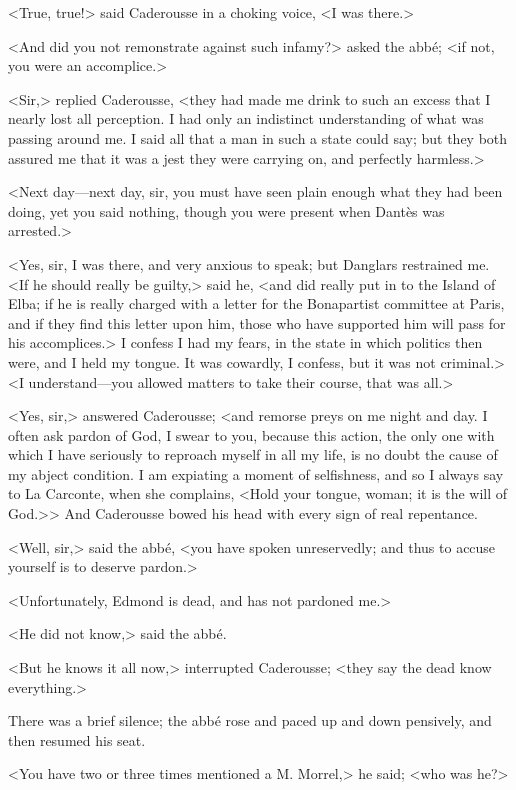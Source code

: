  <True, true!> said Caderousse in a choking voice, <I was there.> 

 <And did you not remonstrate against such infamy?> asked the abbé; <if not, you were an accomplice.> 

 <Sir,> replied Caderousse, <they had made me drink to such an excess that I nearly lost all perception. I had only an indistinct understanding of what was passing around me. I said all that a man in such a state could say; but they both assured me that it was a jest they were carrying on, and perfectly harmless.> 

 <Next day—next day, sir, you must have seen plain enough what they had been doing, yet you said nothing, though you were present when Dantès was arrested.> 

 <Yes, sir, I was there, and very anxious to speak; but Danglars restrained me. <If he should really be guilty,> said he, <and did really put in to the Island of Elba; if he is really charged with a letter for the Bonapartist committee at Paris, and if they find this letter upon him, those who have supported him will pass for his accomplices.> I confess I had my fears, in the state in which politics then were, and I held my tongue. It was cowardly, I confess, but it was not criminal.>  <I understand—you allowed matters to take their course, that was all.> 

 <Yes, sir,> answered Caderousse; <and remorse preys on me night and day. I often ask pardon of God, I swear to you, because this action, the only one with which I have seriously to reproach myself in all my life, is no doubt the cause of my abject condition. I am expiating a moment of selfishness, and so I always say to La Carconte, when she complains, <Hold your tongue, woman; it is the will of God.>> And Caderousse bowed his head with every sign of real repentance. 

 <Well, sir,> said the abbé, <you have spoken unreservedly; and thus to accuse yourself is to deserve pardon.> 

 <Unfortunately, Edmond is dead, and has not pardoned me.> 

 <He did not know,> said the abbé. 

 <But he knows it all now,> interrupted Caderousse; <they say the dead know everything.> 

 There was a brief silence; the abbé rose and paced up and down pensively, and then resumed his seat. 

 <You have two or three times mentioned a M. Morrel,> he said; <who was he?> 

